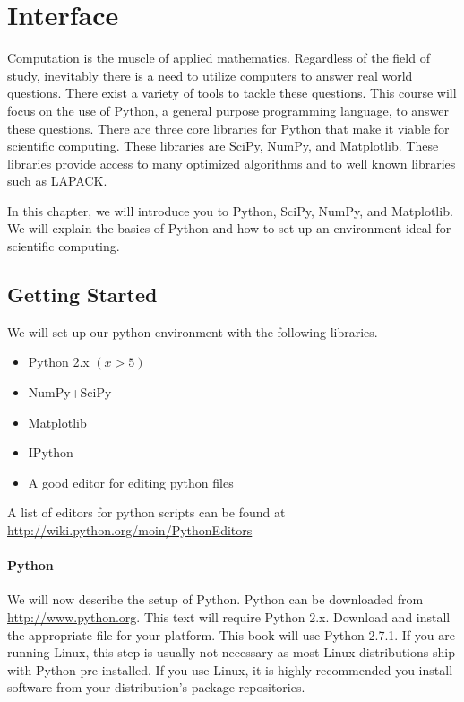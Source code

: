 \setcounter{chapter}{-1}
\chapter{Interface}


Computation is the muscle of applied mathematics. Regardless of the field of study, inevitably there is a need to utilize computers to answer real world questions.  There exist a variety of tools to tackle these questions.  This course will focus on the use of Python, a general purpose programming language, to answer these questions.  There are three core libraries for Python that make it viable for scientific computing.  These libraries are SciPy, NumPy, and Matplotlib.  These libraries provide access to many optimized algorithms and to well known libraries such as LAPACK.

In this chapter, we will introduce you to Python, SciPy, NumPy, and Matplotlib.  We will explain the basics of Python and how to set up an environment ideal for scientific computing.

\section*{Getting Started}
We will set up our python environment with the following libraries.
\begin{itemize}
\item Python 2.x $(x > 5)$
\item NumPy+SciPy
\item Matplotlib
\item IPython
\item A good editor for editing python files
\end{itemize}

A list of editors for python scripts can be found at \url{http://wiki.python.org/moin/PythonEditors}

\subsubsection*{Python}
We will now describe the setup of Python.  Python can be downloaded from \url{http://www.python.org}.  This text will require Python 2.x.  Download and install the appropriate file for your platform.  This book will use Python 2.7.1.  If you are running Linux, this step is usually not necessary as most Linux distributions ship with Python pre-installed.  If you use Linux, it is highly recommended you install software from your distribution's package repositories.

